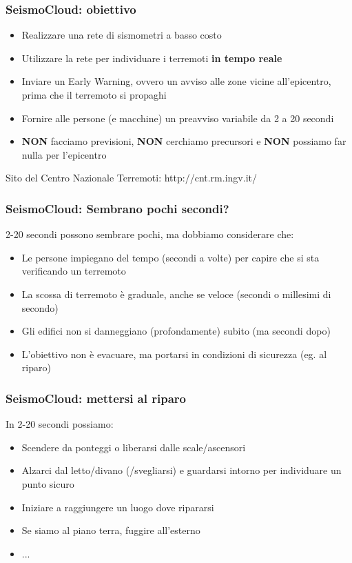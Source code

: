 \begin{frame}
	\frametitle{SeismoCloud: obiettivo}
	
	\begin{itemize}
		\item<1-> Realizzare una rete di sismometri a basso costo
		\item<2-> Utilizzare la rete per individuare i terremoti \textbf{in tempo reale}
		\item<3-> Inviare un Early Warning, ovvero un avviso alle zone vicine all'epicentro, prima che il terremoto si propaghi
		\item<4-> Fornire alle persone (e macchine) un preavviso variabile da 2 a 20 secondi
		\item<5-> \textbf{NON} facciamo previsioni, \textbf{NON} cerchiamo precursori e \textbf{NON} possiamo far nulla per l'epicentro
	\end{itemize}
	
	Sito del Centro Nazionale Terremoti: http://cnt.rm.ingv.it/
	
\end{frame}
\begin{frame}
	\frametitle{SeismoCloud: Sembrano pochi secondi?}
	
	2-20 secondi possono sembrare pochi, ma dobbiamo considerare che:
	\pause
	\begin{itemize}
		\item<2-> Le persone impiegano del tempo (secondi a volte) per capire che si sta verificando un terremoto
		\item<3-> La scossa di terremoto è graduale, anche se veloce (secondi o millesimi di secondo)
		\item<4-> Gli edifici non si danneggiano (profondamente) subito (ma secondi dopo)
		\item<5-> L'obiettivo non è evacuare, ma portarsi in condizioni di sicurezza (eg. al riparo)
	\end{itemize}
	
\end{frame}
\begin{frame}
	\frametitle{SeismoCloud: mettersi al riparo}
	
	In 2-20 secondi possiamo:
	\pause
	\begin{itemize}
		\item<2-> Scendere da ponteggi o liberarsi dalle scale/ascensori
		\item<3-> Alzarci dal letto/divano (/svegliarsi) e guardarsi intorno per individuare un punto sicuro
		\item<4-> Iniziare a raggiungere un luogo dove ripararsi
		\item<5-> Se siamo al piano terra, fuggire all'esterno
		\item<6-> ...
	\end{itemize}
	
\end{frame}
